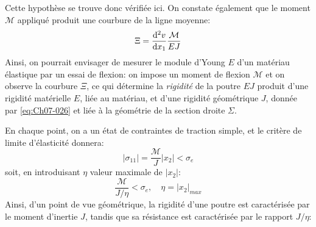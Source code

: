 Cette hypothèse se trouve donc vérifiée ici.
On constate également que le moment $\mathcal{M}$ appliqué produit une courbure de la ligne moyenne:
\begin{equation}
    \Xi = \frac{\mathop{\mathrm{{}d}}\mathopen{}^2 v}{\mathop{\mathrm{{}d}}\mathopen{} x_1} \frac{\mathcal{M}}{EJ}
    \label{eq:Ch07-034}
\end{equation}
Ainsi, on pourrait envisager de mesurer le module d'Young $E$ d'un matériau élastique par un essai de flexion: on impose un moment de flexion $\mathcal{M}$ et on observe la courbure $\Xi$, ce qui détermine la \emph{rigidité} de la poutre $EJ$ produit d'une rigidité matérielle $E$, liée au matériau, et d'une rigidité géométrique $J$, donnée par \eqref{eq:Ch07-026} et liée à la géométrie de la section droite $\Sigma$.

En chaque point, on a un état de contraintes de traction simple, et le critère de limite d'élasticité donnera: 
\begin{equation}
    \left|\sigma_{11}\right| = \frac{\mathcal{M}}{J} \left|x_2\right| < \sigma_e
    \label{eq:Ch07-035}
\end{equation}
soit, en introduisant $\eta$ valeur maximale de $\left|x_2\right|$:
\begin{equation}
    \frac{\mathcal{M}}{J/\eta} < \sigma_e, \quad \eta = \left|x_2\right|_{max}
    \label{eq:Ch07-036}
\end{equation}
Ainsi, d'un point de vue géométrique, la rigidité d'une poutre est caractérisée  par le moment  d'inertie $J$,  tandis que sa résistance est caractérisée par le rapport $J/\eta$:
